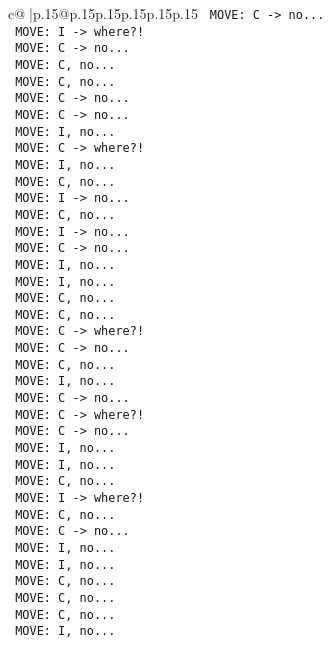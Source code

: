 \documentclass{article}
\begin{document}
{\begin{supertabular}{c@{$\;$}|p{.15\linewidth}@{}p{.15\linewidth}p{.15\linewidth}p{.15\linewidth}p{.15\linewidth}p{.15\linewidth}}
{{{\texttt{ MOVE: C {-}> no...} \\
\texttt{ MOVE: I {-}> where?!} \\
\texttt{ MOVE: C {-}> no...} \\
\texttt{ MOVE: C, no...} \\
\texttt{ MOVE: C, no...} \\
\texttt{ MOVE: C {-}> no...} \\
\texttt{ MOVE: C {-}> no...} \\
\texttt{ MOVE: I, no...} \\
\texttt{ MOVE: C {-}> where?!} \\
\texttt{ MOVE: I, no...} \\
\texttt{ MOVE: C, no...} \\
\texttt{ MOVE: I {-}> no...} \\
\texttt{ MOVE: C, no...} \\
\texttt{ MOVE: I {-}> no...} \\
\texttt{ MOVE: C {-}> no...} \\
\texttt{ MOVE: I, no...} \\
\texttt{ MOVE: I, no...} \\
\texttt{ MOVE: C, no...} \\
\texttt{ MOVE: C, no...} \\
\texttt{ MOVE: C {-}> where?!} \\
\texttt{ MOVE: C {-}> no...} \\
\texttt{ MOVE: C, no...} \\
\texttt{ MOVE: I, no...} \\
\texttt{ MOVE: C {-}> no...} \\
\texttt{ MOVE: C {-}> where?!} \\
\texttt{ MOVE: C {-}> no...} \\
\texttt{ MOVE: I, no...} \\
\texttt{ MOVE: I, no...} \\
\texttt{ MOVE: C, no...} \\
\texttt{ MOVE: I {-}> where?!} \\
\texttt{ MOVE: C, no...} \\
\texttt{ MOVE: C {-}> no...} \\
\texttt{ MOVE: I, no...} \\
\texttt{ MOVE: I, no...} \\
\texttt{ MOVE: C, no...} \\
\texttt{ MOVE: C, no...} \\
\texttt{ MOVE: C, no...} \\
\texttt{ MOVE: I, no...} \\
}}}
\end{supertabular}}
\end{document}
